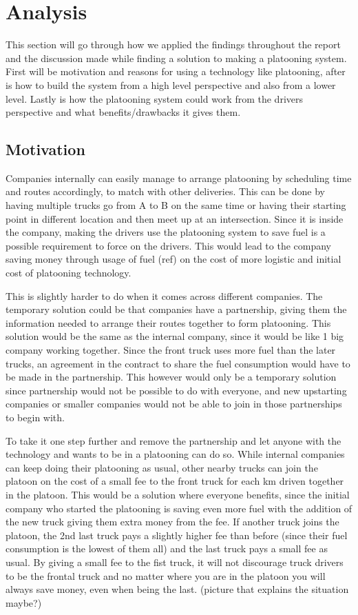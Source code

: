 \section{Analysis}\label{sec:analysis}
% 

This section will go through how we applied the findings throughout the report and the discussion made while finding a solution to making a platooning system. First will be motivation and reasons for using a technology like platooning, after is how to build the system from a high level perspective and also from a lower level. Lastly is how the platooning system could work from the drivers perspective and what benefits/drawbacks it gives them.  
% 
\subsection{Motivation}
Companies internally can easily manage to arrange platooning by scheduling time and routes accordingly, to match with other deliveries. This can be done by having multiple trucks go from A to B on the same time or having their starting point in different location and then meet up at an intersection. Since it is inside the company, making the drivers use the platooning system to save fuel is a possible requirement to force on the drivers. This would lead to the company saving money through usage of fuel (ref) on the cost of more logistic and initial cost of platooning technology.\par
% 
This is slightly harder to do when it comes across different companies. The temporary solution could be that companies have a partnership, giving them the information needed to arrange their routes together to form platooning. This solution would be the same as the internal company, since it would be like 1 big company working together. Since the front truck uses more fuel than the later trucks, an agreement in the contract to share the fuel consumption would have to be made in the partnership. This however would only be a temporary solution since partnership would not be possible to do with everyone, and new upstarting companies or smaller companies would not be able to join in those partnerships to begin with.\par
% 
To take it one step further and remove the partnership and let anyone with the technology and wants to be in a platooning can do so. While internal companies can keep doing their platooning as usual, other nearby trucks can join the platoon on the cost of a small fee to the front truck for each km driven together in the platoon. This would be a solution where everyone benefits, since the initial company who started the platooning is saving even more fuel with the addition of the new truck giving them extra money from the fee. If another truck joins the platoon, the 2nd last truck pays a slightly higher fee than before (since their fuel consumption is the lowest of them all) and the last truck pays a small fee as usual\footnotemark. By giving a small fee to the fist truck, it will not discourage truck drivers to be the frontal truck and no matter where you are in the platoon you will always save money, even when being the last.
% 
(picture that explains the situation maybe?)
% 
% 
